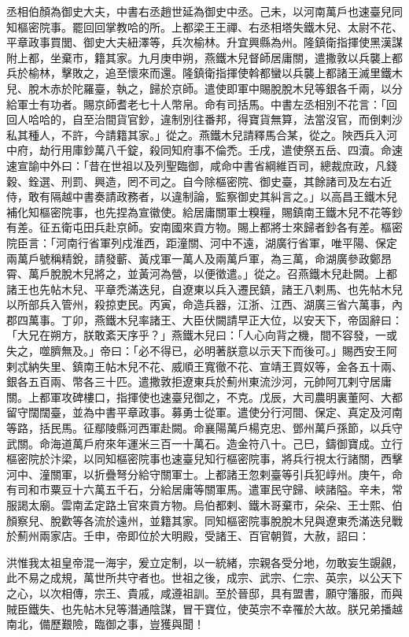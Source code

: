 \begin{pinyinscope}
丞相伯顏為御史大夫，中書右丞趙世延為御史中丞。己未，以河南萬戶也速臺兒同知樞密院事。罷回回掌教哈的所。上都梁王王禪、右丞相塔失鐵木兒、太尉不花、平章政事買閭、御史大夫紐澤等，兵次榆林。升宜興縣為州。隆鎮衛指揮使黑漢謀附上都，坐棄市，籍其家。九月庚申朔，燕鐵木兒督師居庸關，遣撒敦以兵襲上都兵於榆林，擊敗之，追至懷來而還。隆鎮衛指揮使斡都蠻以兵襲上都諸王滅里鐵木兒、脫木赤於陀羅臺，執之，歸於京師。遣使即軍中賜脫脫木兒等銀各千兩，以分給軍士有功者。賜京師耆老七十人幣帛。命有司括馬。中書左丞相別不花言：「回回人哈哈的，自至治間貨官鈔，違制別往番邦，得寶貨無算，法當沒官，而倒剌沙私其種人，不許，今請籍其家。」從之。燕鐵木兒請釋馬合某，從之。陜西兵入河中府，劫行用庫鈔萬八千錠，殺同知府事不倫禿。壬戌，遣使祭五岳、四瀆。命速速宣諭中外曰：「昔在世祖以及列聖臨御，咸命中書省綱維百司，總裁庶政，凡錢穀、銓選、刑罰、興造，罔不司之。自今除樞密院、御史臺，其餘諸司及左右近侍，敢有隔越中書奏請政務者，以違制論，監察御史其糾言之。」以高昌王鐵木兒補化知樞密院事，也先捏為宣徽使。給居庸關軍士糗糧，賜鎮南王鐵木兒不花等鈔有差。征五衛屯田兵赴京師。安南國來貢方物。賜上都將士來歸者鈔各有差。樞密院臣言：「河南行省軍列戍淮西，距潼關、河中不遠，湖廣行省軍，唯平陽、保定兩萬戶號稱精銳，請發蘄、黃戍軍一萬人及兩萬戶軍，為三萬，命湖廣參政鄭昂霄、萬戶脫脫木兒將之，並黃河為營，以便徵遣。」從之。召燕鐵木兒赴闕。上都諸王也先帖木兒、平章禿滿迭兒，自遼東以兵入遷民鎮，諸王八剌馬、也先帖木兒以所部兵入管州，殺掠吏民。丙寅，命造兵器，江浙、江西、湖廣三省六萬事，內郡四萬事。丁卯，燕鐵木兒率諸王、大臣伏闕請早正大位，以安天下，帝固辭曰：「大兄在朔方，朕敢紊天序乎？」燕鐵木兒曰：「人心向背之機，間不容發，一或失之，噬臍無及。」帝曰：「必不得已，必明著朕意以示天下而後可。」賜西安王阿剌忒納失里、鎮南王帖木兒不花、威順王寬徹不花、宣靖王買奴等，金各五十兩、銀各五百兩、幣各三十匹。遣撒敦拒遼東兵於薊州東流沙河，元帥阿兀剌守居庸關。上都軍攻碑樓口，指揮使也速臺兒御之，不克。戊辰，大司農明裏董阿、大都留守闊闊臺，並為中書平章政事。募勇士從軍。遣使分行河間、保定、真定及河南等路，括民馬。征鄢陵縣河西軍赴闕。命襄陽萬戶楊克忠、鄧州萬戶孫節，以兵守武關。命海道萬戶府來年運米三百一十萬石。造金符八十。己巳，鑄御寶成。立行樞密院於汴梁，以同知樞密院事也速臺兒知行樞密院事，將兵行視太行諸關，西擊河中、潼關軍，以折疊弩分給守關軍士。上都諸王忽剌臺等引兵犯崞州。庚午，命有司和市粟豆十六萬五千石，分給居庸等關軍馬。遣軍民守歸、峽諸隘。辛未，常服謁太廟。雲南孟定路土官來貢方物。烏伯都剌、鐵木哥棄市，朵朵、王士熙、伯顏察兒、脫歡等各流於遠州，並籍其家。同知樞密院事脫脫木兒與遼東禿滿迭兒戰於薊州兩家店。壬申，帝即位於大明殿，受諸王、百官朝賀，大赦，詔曰：



 洪惟我太祖皇帝混一海宇，爰立定制，以一統緒，宗親各受分地，勿敢妄生覬覦，此不易之成規，萬世所共守者也。世祖之後，成宗、武宗、仁宗、英宗，以公天下之心，以次相傳，宗王、貴戚，咸遵祖訓。至於晉邸，具有盟書，願守籓服，而與賊臣鐵失、也先帖木兒等潛通陰謀，冒干寶位，使英宗不幸罹於大故。朕兄弟播越南北，備歷艱險，臨御之事，豈獲與聞！




\end{pinyinscope}
